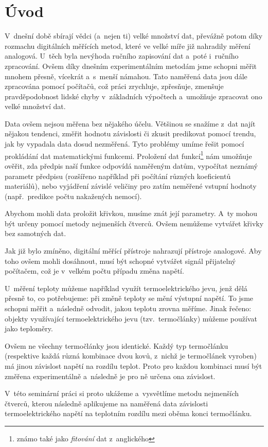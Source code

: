 \section{Úvod}
V~dnešní době sbírají vědci (a~nejen ti) velké množství dat, převážně potom
díky rozmachu digitálních měřících metod, které ve velké míře již nahradily
měření analogová. U~těch byla nevýhoda ručního zapisování dat a~poté i~ručního
zpracování. Ovšem díky dnešním experimentálním metodám jsme schopni měřit
mnohem přesně, vícekrát a~s~menší námahou. Tato naměřená data jsou dále
zpracována pomocí počítačů, což práci zrychluje, zpřesňuje, zmenšuje
pravděpodobnost lidské chyby v~základních výpočtech a~umožňuje zpracovat ono
velké množství dat.

Data ovšem nejsou měřena bez nějakého účelu. Většinou se snažíme z~dat najít
nějakou tendenci, změřit hodnotu závislosti či zkusit predikovat pomocí trendu,
jak by vypadala data dosud nezměřená. Tyto problémy umíme řešit pomocí
prokládání dat matematickými funkcemi. Proložení dat funkcí\footnote{známo také
jako \emph{fitování} dat z~anglického } nám umožňuje ověřit, zda
předpis naší funkce odpovídá naměřeným datům, vypočítat neznámý parametr
předpisu (rozšířeno například při počítání různých koeficientů materiálů), nebo
vyjádření závislé veličiny pro zatím neměřené vstupní hodnoty (např.~predikce
počtu nakažených nemocí).

Abychom mohli data proložit křivkou, musíme znát její parametry. A~ty mohou být
určeny pomocí metody nejmenších čtverců. Ovšem nemůžeme vytvářet křivky bez
samotných dat.

Jak již bylo zmíněno, digitální měřící přístroje nahrazují přístroje analogové.
Aby toho ovšem mohli dosáhnout, musí být schopné vytvářet signál přijatelný
počítačem, což je v~velkém počtu případu změna napětí. 

U~měření teploty můžeme například využít termoelektrického jevu, jenž dělá
přesně to, co potřebujeme: při změně teploty se mění výstupní napětí. To jsme
schopni měřit a~následně odvodit, jakou teplotu zrovna měříme. Jinak řečeno:
objekty využívající termoelektrického jevu (tzv.~termočlánky) můžeme používat
jako teploměry.

Ovšem ne všechny termočlánky jsou identické. Každý typ termočlánku (respektive
každá různá kombinace dvou kovů, z~nichž je termočlánek vyroben) má jinou
závislost napětí na rozdílu teplot. Proto pro každou kombinaci musí být změřena
experimentálně a~následně je pro ně určena ona závislost.

V~této seminární práci si proto ukážeme a~vysvětlíme metodu nejmenších čtverců,
kterou následně aplikujeme na naměřená data závislosti termoelektrického napětí
na teplotním rozdílu mezi oběma konci termočlánku.
